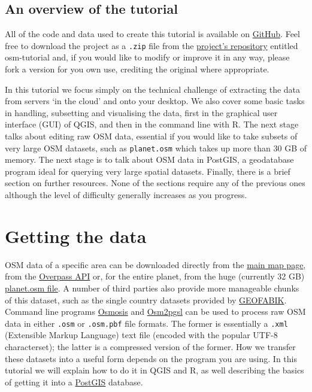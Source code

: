 \documentclass[]{article}
\begin{document}
\subsection{An overview of the tutorial}

All of the code and data used to create this tutorial is available on
\href{http://github.com}{GitHub}. Feel free to download the project as a
\texttt{.zip} file from the
\href{https://github.com/Robinlovelace/osm-tutorial}{project's
repository} entitled osm-tutorial and, if you would like to modify or
improve it in any way, please fork a version for you own use, crediting
the original where appropriate.

In this tutorial we focus simply on the technical challenge of
extracting the data from servers `in the cloud' and onto your desktop.
We also cover some basic tasks in handling, subsetting and visualising
the data, first in the graphical user interface (GUI) of QGIS, and then
in the command line with R. The next stage talks about editing raw OSM
data, essential if you would like to take subsets of very large OSM
datasets, such as \texttt{planet.osm} which takes up more than 30 GB of
memory. The next stage is to talk about OSM data in PostGIS, a
geodatabase program ideal for querying very large spatial datasets.
Finally, there is a brief section on further resources. None of the
sections require any of the previous ones although the level of
difficulty generally increases as you progress.

\section{Getting the data}

OSM data of a specific area can be downloaded directly from the
\href{http://www.openstreetmap.org}{main map page}, from the
\href{http://overpass-api.de/}{Overpass API} or, for the entire planet,
from the huge (currently 32 GB)
\href{http://planet.openstreetmap.org/}{planet.osm file}. A number of
third parties also provide more manageable chunks of this dataset, such
as the single country datasets provided by
\href{http://download.geofabrik.de/}{GEOFABIK}. Command line programs
\href{http://wiki.openstreetmap.org/wiki/Osmosis}{Osmosis} and
\href{http://wiki.openstreetmap.org/wiki/Osm2pgsql}{Osm2pgsl} can be
used to process raw OSM data in either \texttt{.osm} or
\texttt{.osm.pbf} file formats. The former is essentially a
\texttt{.xml} (Extensible Markup Language) text file (encoded with the
popular UTF-8 characterset); the latter is a compressed version of the
former. How we transfer these datasets into a useful form depends on the
program you are using. In this tutorial we will explain how to do it in
QGIS and R, as well describing the basics of getting it into a
\href{http://postgis.net/}{PostGIS} database.
\end{document}

